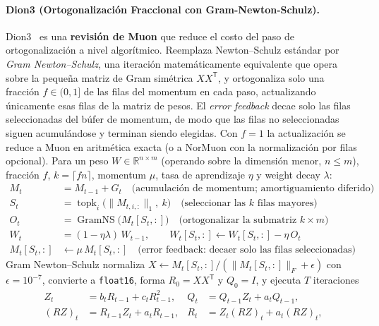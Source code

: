 \paragraph{Dion3 (Ortogonalización Fraccional con Gram-Newton-Schulz).}
Dion3~\citep{amsel_dion3_2026} es una \textbf{revisión de Muon} que reduce el costo del paso de ortogonalización a nivel algorítmico. Reemplaza Newton--Schulz estándar por \emph{Gram Newton--Schulz}, una iteración matemáticamente equivalente que opera sobre la pequeña matriz de Gram simétrica $XX^{\mathsf T}$, y ortogonaliza solo una fracción $f \in (0,1]$ de las filas del momentum en cada paso, actualizando únicamente esas filas de la matriz de pesos. El \emph{error feedback} decae solo las filas seleccionadas del búfer de momentum, de modo que las filas no seleccionadas siguen acumulándose y terminan siendo elegidas. Con $f = 1$ la actualización se reduce a Muon en aritmética exacta (o a NorMuon con la normalización por filas opcional). Para un peso $W \in \mathbb{R}^{n \times m}$ (operando sobre la dimensión menor, $n \le m$), fracción $f$, $k = \lceil f n \rceil$, momentum $\mu$, tasa de aprendizaje $\eta$ y weight decay $\lambda$:
\begin{align}
M_t &= M_{t-1} + G_t \quad\text{(acumulación de momentum; amortiguamiento diferido)} \\
S_t &= \operatorname{topk}_{i}\bigl(\lVert M_{t,i,:}\rVert_1,\ k\bigr) \quad\text{(seleccionar las } k \text{ filas mayores)} \\
O_t &= \operatorname{GramNS}\bigl(M_t[S_t,:]\bigr) \quad\text{(ortogonalizar la submatriz } k \times m\text{)} \\
W_t &= (1 - \eta\lambda)\, W_{t-1}, \qquad W_t[S_t,:] \gets W_t[S_t,:] - \eta\, O_t \\
M_t[S_t,:] &\gets \mu\, M_t[S_t,:] \quad\text{(error feedback: decaer solo las filas seleccionadas)}
\end{align}
Gram Newton--Schulz normaliza $X \gets M_t[S_t,:]/(\lVert M_t[S_t,:]\rVert_F + \epsilon)$ con $\epsilon = 10^{-7}$, convierte a \texttt{float16}, forma $R_0 = X X^{\mathsf T}$ y $Q_0 = I$, y ejecuta $T$ iteraciones
\begin{align}
Z_t &= b_t R_{t-1} + c_t R_{t-1}^2, &
Q_t &= Q_{t-1} Z_t + a_t Q_{t-1}, \\
(RZ)_t &= R_{t-1} Z_t + a_t R_{t-1}, &
R_t &= Z_t (RZ)_t + a_t (RZ)_t,
\end{align}
